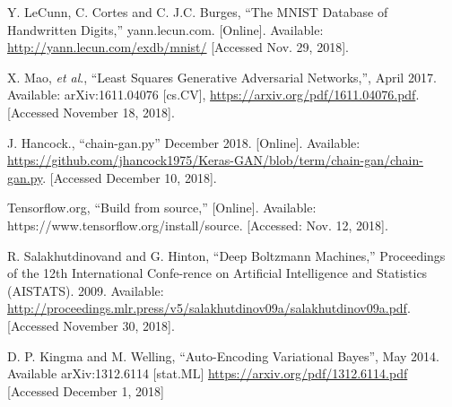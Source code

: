\documentclass[conference]{IEEEtran}
\begin{document}
\begin{thebibliography}{00}
 Y. LeCunn, C. Cortes and C. J.C. Burges, ``The MNIST Database of 
Handwritten Digits,'' yann.lecun.com. [Online]. Available:
\url{http://yann.lecun.com/exdb/mnist/} [Accessed Nov.  29, 2018].

 X. Mao, \textit{et al}., ``Least Squares Generative Adversarial 
Networks,'', April 2017. Available:   arXiv:1611.04076 [cs.CV],
\url{https://arxiv.org/pdf/1611.04076.pdf}.  [Accessed November 18, 2018].

 J. Hancock., ``chain-gan.py'' December 2018. [Online].
Available:
\url{https://github.com/jhancock1975/Keras-GAN/blob/term/chain-gan/chain-gan.py}.
[Accessed December 10, 2018].

 Tensorflow.org, ``Build from source,''
 [Online].  Available: https://www.tensorflow.org/install/source. 
[Accessed: Nov. 12, 2018].

 R. Salakhutdinovand and G. Hinton, ``Deep Boltzmann
Machines,'' Proceedings of the 12th International Confe-rence
on Artificial Intelligence and Statistics (AISTATS). 2009. Available:
\url{http://proceedings.mlr.press/v5/salakhutdinov09a/salakhutdinov09a.pdf}.
 [Accessed November 30, 2018].

 D. P. Kingma and M. Welling, ``Auto-Encoding Variational
Bayes'', May 2014.  Available   arXiv:1312.6114 [stat.ML]
\url{https://arxiv.org/pdf/1312.6114.pdf} [Accessed December 1, 2018]

\end{thebibliography}
\end{document}
